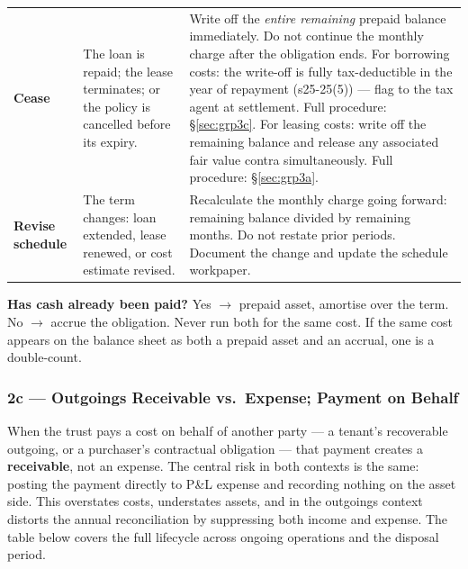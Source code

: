 \documentclass[10pt,a4paper]{article}
\begin{document}
{\begin{longtable}{@{} L{2.0cm} L{3.0cm} L{7.7cm} @{}}
\textbf{Cease} & The loan is repaid; the lease terminates; or the policy is cancelled before its expiry. & Write off the \emph{entire remaining} prepaid balance immediately. Do not continue the monthly charge after the obligation ends. For borrowing costs: the write-off is fully tax-deductible in the year of repayment (s25-25(5)) --- flag to the tax agent at settlement. Full procedure: \S\ref{sec:grp3c}. For leasing costs: write off the remaining balance and release any associated fair value contra simultaneously. Full procedure: \S\ref{sec:grp3a}. \\
\textbf{Revise schedule} & The term changes: loan extended, lease renewed, or cost estimate revised. & Recalculate the monthly charge going forward: remaining balance divided by remaining months. Do not restate prior periods. Document the change and update the schedule workpaper. \\
\bottomrule
\end{longtable}}

\begin{note}
\textbf{Has cash already been paid?} Yes $\to$ prepaid asset, amortise over the term. No $\to$ accrue the obligation. Never run both for the same cost. If the same cost appears on the balance sheet as both a prepaid asset and an accrual, one is a double-count.
\end{note}


\subsubsection{2c --- Outgoings Receivable vs.\ Expense; Payment on Behalf}
\label{sec:grp2c}
\label{sec:grp2d}

When the trust pays a cost on behalf of another party --- a tenant's recoverable outgoing, or a purchaser's contractual obligation --- that payment creates a \textbf{receivable}, not an expense. The central risk in both contexts is the same: posting the payment directly to P\&L expense and recording nothing on the asset side. This overstates costs, understates assets, and in the outgoings context distorts the annual reconciliation by suppressing both income and expense. The table below covers the full lifecycle across ongoing operations and the disposal period.
\end{document}

